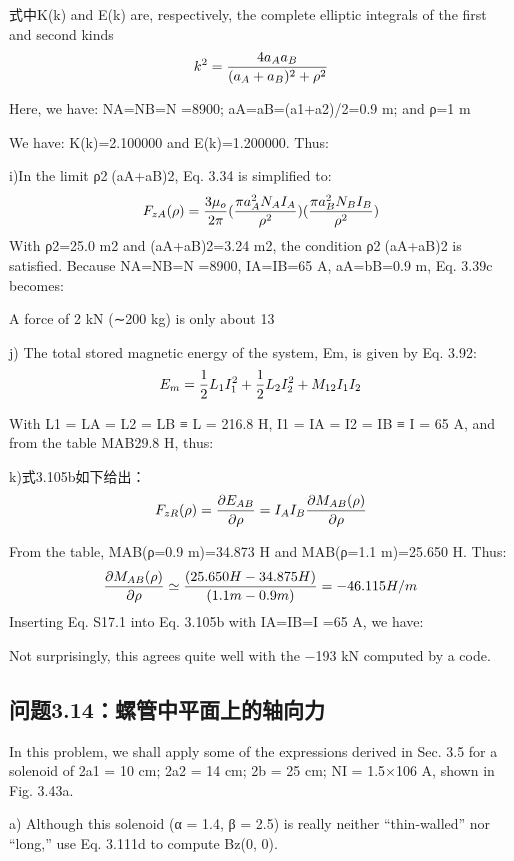 式中K(k) and E(k) are, respectively, the complete elliptic integrals of the first
and second kinds
$$
k^{2}=\frac{4a_{A}a_{B}}{(a_{A}+a_{B})^{2}+\rho^{2}}\\%
$$

Here, we have: NA=NB=N =8900; aA=aB=(a1+a2)/2=0.9 m; and ρ=1 m

We have: K(k)=2.100000 and E(k)=1.200000. Thus:



i)In the limit ρ2(aA+aB)2, Eq. 3.34 is simplified to:
$$
F_{zA}(\rho)=\frac{3\mu_{o}}{2\pi}(\frac{\pi a_{A}^{2}N_{A}I_{A}}{\rho^{2}})(\frac{\pi a_{B}^{2}N_{B}I_{B}}{\rho^{2}})\\%
$$
With ρ2=25.0 m2 and (aA+aB)2=3.24 m2, the condition ρ2(aA+aB)2 is satisfied.
Because NA=NB=N =8900, IA=IB=65 A, aA=bB=0.9 m, Eq. 3.39c becomes:

A force of 2 kN (∼200 kg) is only about 13%

j) The total stored magnetic energy of the system, Em, is given by Eq. 3.92:
$$
E_{m}=\frac{1}{2}L_{1}I_{1}^{2}+\frac{1}{2}L_{2}I_{2}^{2}+M_{12}I_{1}I_{2}\\%
$$

With L1 = LA = L2 = LB ≡ L = 216.8 H, I1 = IA = I2 = IB ≡ I = 65 A, and from the
table MAB29.8 H, thus:


k)式3.105b如下给出：
$$
F_{zR}(\rho)=\frac{\partial E_{AB}}{\partial \rho}=I_{A}I_{B}\frac{\partial M_{AB}(\rho)}{\partial\rho}\\%
$$

From the table, MAB(ρ=0.9 m)=34.873 H and MAB(ρ=1.1 m)=25.650 H. Thus:
$$
\frac{\partial M_{AB}(\rho)}{\partial\rho}\simeq\frac{(25.650H-34.875H)}{(1.1m-0.9m)}=-46.115H/m\\%
$$
Inserting Eq. S17.1 into Eq. 3.105b with IA=IB=I =65 A, we have:

Not surprisingly, this agrees quite well with the −193 kN computed by a code.
\newpage


\subsection{问题3.14：螺管中平面上的轴向力}
In this problem, we shall apply some of the expressions derived in Sec. 3.5 for
a solenoid of 2a1 = 10 cm; 2a2 = 14 cm; 2b = 25 cm; NI = 1.5×106 A, shown in
Fig. 3.43a.

a) Although this solenoid (α = 1.4, β = 2.5) is really neither “thin-walled” nor
“long,” use Eq. 3.111d to compute Bz(0, 0).

